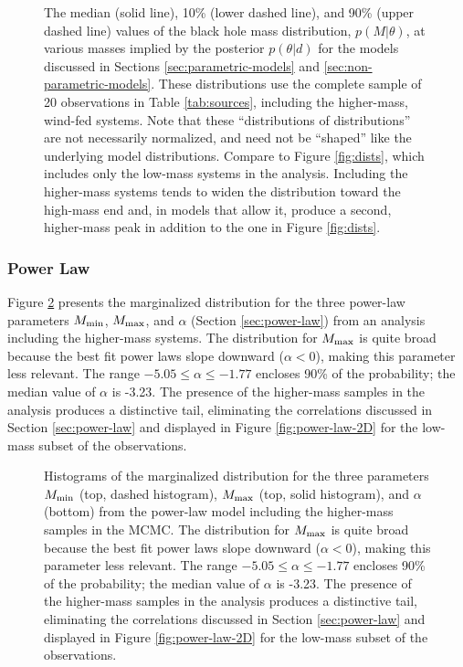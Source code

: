 \documentclass[preprint]{aastex}
\newcommand{\Mmin}{M_{\textnormal{min}}}
\newcommand{\Mmax}{M_{\textnormal{max}}}
\begin{document}
\begin{figure}
  \begin{center}
  \end{center}
  \caption{\label{fig:high-mass-dists} The median (solid line), 10\%
    (lower dashed line), and 90\% (upper dashed line) values of the
    black hole mass distribution, $p(M|\theta)$, at various masses
    implied by the posterior $p(\theta|d)$ for the models discussed in
    Sections \ref{sec:parametric-models} and
    \ref{sec:non-parametric-models}.  These distributions use the
    complete sample of 20 observations in Table \ref{tab:sources},
    including the higher-mass, wind-fed systems.  Note that these
    ``distributions of distributions'' are not necessarily normalized,
    and need not be ``shaped'' like the underlying model
    distributions.  Compare to Figure \ref{fig:dists}, which includes
    only the low-mass systems in the analysis.  Including the
    higher-mass systems tends to widen the distribution toward the
    high-mass end and, in models that allow it, produce a second,
    higher-mass peak in addition to the one in Figure
    \ref{fig:dists}. }
\end{figure}

\subsubsection{Power Law}

Figure \ref{fig:power-law-high} presents the marginalized
distribution for the three power-law parameters $\Mmin$, $\Mmax$, and
$\alpha$ (Section \ref{sec:power-law}) from an analysis including the
higher-mass systems.  The distribution for $\Mmax$ is quite broad
because the best fit power laws slope downward ($\alpha < 0$), making
this parameter less relevant.  The range $-5.05 \leq \alpha \leq
-1.77$ encloses 90\% of the probability; the median value of $\alpha$
is -3.23.  The presence of the higher-mass samples in the analysis
produces a distinctive tail, eliminating the correlations discussed in
Section \ref{sec:power-law} and displayed in Figure
\ref{fig:power-law-2D} for the low-mass subset of the observations.

\begin{figure}
  \begin{center}
  \end{center}
  \caption{\label{fig:power-law-high} Histograms of the marginalized
    distribution for the three parameters $\Mmin$ (top, dashed
    histogram), $\Mmax$ (top, solid histogram), and $\alpha$ (bottom)
    from the power-law model including the higher-mass samples in the
    MCMC.  The distribution for $\Mmax$ is quite broad because the
    best fit power laws slope downward ($\alpha < 0$), making this
    parameter less relevant.  The range $-5.05 \leq \alpha \leq -1.77$
    encloses 90\% of the probability; the median value of $\alpha$ is
    -3.23.  The presence of the higher-mass samples in the analysis
    produces a distinctive tail, eliminating the correlations
    discussed in Section \ref{sec:power-law} and displayed in Figure
    \ref{fig:power-law-2D} for the low-mass subset of the
    observations. }
\end{figure}
\end{document}
